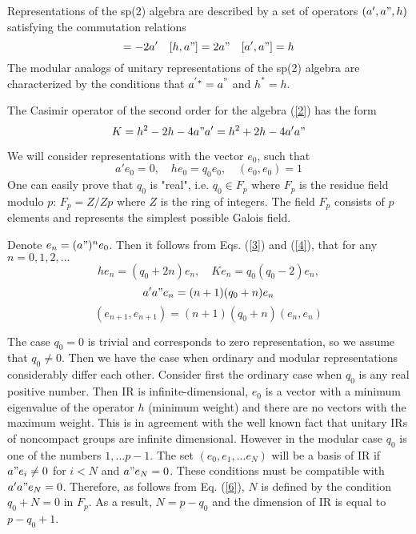 \documentclass[a4paper,12pt]{article}%
\begin{document}
Representations of the sp(2) algebra are described by a
set of operators $(a',a",h)$ satisfying the 
commutation relations 
\begin{equation}
[h,a']=-2a'\quad [h,a"]=2a"\quad [a',a"]=h
\label{2}
\end{equation} 
The modular analogs of unitary representations of the
sp(2) algebra are characterized
by the conditions that $a^{'*}=a^"$ and $h^*=h$. 

The  Casimir operator of the second order for the algebra
(\ref{2}) has the form
\begin{equation}
K=h^2-2h-4a"a'=h^2+2h-4a'a"
\label{3}
\end{equation}

We will consider representations with the vector $e_0$, such that
\begin{equation}
a'e_0=0,\quad he_0=q_0e_0,\quad (e_0,e_0)=1 
\label{4}
\end{equation} 
One can easily prove \cite{lev1,lev2} that $q_0$ is
"real", i.e. $q_0\in F_p$ where $F_p$ is the residue field
modulo $p$: $F_p=Z/Zp$ where $Z$ is the ring of integers.
The field $F_p$ consists of $p$ elements and represents the
simplest possible Galois field.

Denote $e_n =(a")^ne_0$.
Then it follows from Eqs. (\ref{3}) and (\ref{4}),
that for any $n=0,1,2,...$
\begin{equation}
he_n=(q_0+2n)e_n,\quad Ke_n=q_0(q_0-2)e_n, 
\label{5}
\end{equation} 
\begin{equation}
a'a"e_n=(n+1)(q_0+n)e_n
\label{6}
\end{equation}
\begin{equation}
(e_{n+1},e_{n+1})=(n+1)(q_0+n)(e_n,e_n)
\label{7}
\end{equation}

The case $q_0=0$ is trivial and corresponds to zero representation,
so we assume that $q_0\neq 0$. Then we have the case when ordinary 
and modular representations considerably differ each other. 
Consider first the ordinary case when $q_0$ is any real positive 
number. Then IR is infinite-dimensional, $e_0$ is a vector
with a minimum eigenvalue of the operator $h$ (minimum weight)
and there are no vectors with the maximum weight. This is in 
agreement with the well known fact that unitary IRs of
noncompact groups are infinite dimensional. However in the
modular case $q_0$ is one of the numbers $1,...p-1$. 
The set $(e_0,e_1,...e_N)$ will be a basis
of IR if $a"e_i\neq 0$ for $i<N$ and $a"e_N=0$. These conditions
must be compatible with $a'a"e_N=0$. Therefore, as follows from
Eq. (\ref{6}), $N$ is defined by the condition $q_0+N=0$ in
$F_p$. As a result, $N=p-q_0$ and the dimension of IR is equal
to $p-q_0+1$.  
\end{document}
